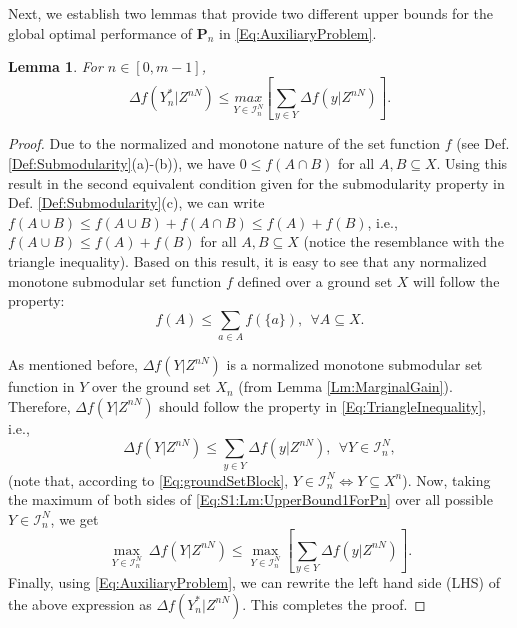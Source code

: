 \documentclass[letterpaper, 10 pt, conference]{ieeeconf}
\newtheorem{lemma}{Lemma}
\begin{document}
{%

Next, we establish two lemmas that provide two different upper bounds for the global optimal performance of $\mathbf{P}_n$ in \eqref{Eq:AuxiliaryProblem}.
\begin{lemma}\label{Lm:UpperBound1ForPn} 
For $n\in[0,m-1]$,
\begin{equation}\label{Eq:Lm:UpperBound1ForPn}
\Delta f(Y^*_n\vert Z^{nN}) \leq  \underset{Y\in\mathcal{I}^N_n}{max} \left[ \sum_{y\in Y} \Delta f(y\vert Z^{nN}) \right].
\end{equation}
\end{lemma}

\begin{proof}
Due to the normalized and monotone nature of the set function $f$ (see Def. \ref{Def:Submodularity}(a)-(b)), we have $0 \leq f(A \cap B)$ for all $A,B \subseteq X$. Using this result in the second equivalent condition given for the submodularity property in Def. \ref{Def:Submodularity}(c), we can write $f(A \cup B) \leq f(A \cup B) + f(A \cap B) \leq f(A) + f(B)$, i.e., $f(A \cup B) \leq f(A) + f(B)$ for all $A,B\subseteq X$ (notice the resemblance with the triangle inequality). Based on this result, it is easy to see that any normalized monotone submodular set function $f$ defined over a ground set $X$ will follow the property: 
\begin{equation}\label{Eq:TriangleInequality}
    f(A)\leq \sum_{a \in A} f(\{a\}), \ \ \forall A \subseteq X.
\end{equation}

As mentioned before, $\Delta f(Y \vert Z^{nN})$ is a normalized monotone submodular set function in $Y$ over the ground set $X_n$ (from Lemma \ref{Lm:MarginalGain}). Therefore, $\Delta f(Y \vert Z^{nN})$ should follow the property in \eqref{Eq:TriangleInequality}, i.e., 
\begin{equation}\label{Eq:S1:Lm:UpperBound1ForPn}
    \Delta f(Y \vert Z^{nN}) \leq \sum_{y \in Y} \Delta f(y\vert Z^{nN}),\ \ \forall Y \in \mathcal{I}^N_n, 
\end{equation}
(note that, according to \eqref{Eq:groundSetBlock}, $Y \in \mathcal{I}^N_n \iff Y \subseteq X^n$). Now, taking the maximum of both sides of \eqref{Eq:S1:Lm:UpperBound1ForPn} over all possible $Y \in \mathcal{I}^N_n$, we get 
\begin{equation}
    \underset{Y\in\mathcal{I}^N_n}{\max}\ \Delta f(Y \vert Z^{nN}) \leq \underset{Y\in\mathcal{I}^N_n}{\max} \left[\sum_{y \in Y} \Delta f(y\vert Z^{nN})\right].
\end{equation}
Finally, using \eqref{Eq:AuxiliaryProblem}, we can rewrite the left hand side (LHS) of the above expression as $\Delta f(Y^*_n\vert Z^{nN})$. This completes the proof. 
\end{proof}




}
\end{document}
